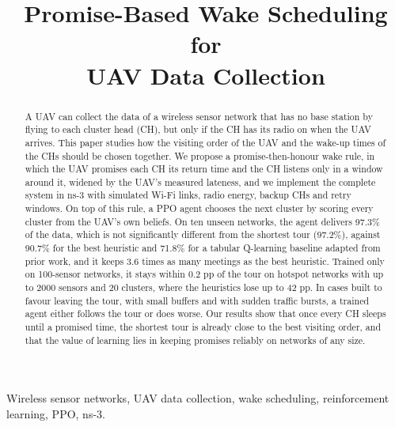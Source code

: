 \documentclass[conference]{IEEEtran}
\begin{document}
\title{Promise-Based Wake Scheduling for\\UAV Data Collection}

\author{
}

\maketitle

\begin{abstract}
A UAV can collect the data of a wireless sensor network that has no base station by flying to
each cluster head (CH), but only if the CH has its radio on when the UAV arrives. This paper
studies how the visiting order of the UAV and the wake-up times of the CHs should be chosen
together. We propose a promise-then-honour wake rule, in which the UAV promises each CH its
return time and the CH listens only in a window around it, widened by the UAV's measured
lateness, and we implement the complete system in ns-3 with simulated Wi-Fi links, radio
energy, backup CHs and retry windows. On top of this rule, a PPO agent chooses the next cluster
by scoring every cluster from the UAV's own beliefs. On ten unseen networks, the agent delivers
97.3\% of the data, which is not significantly different from the shortest tour (97.2\%),
against 90.7\% for the best heuristic and 71.8\% for a tabular Q-learning baseline adapted from
prior work, and it keeps 3.6 times as many meetings as the best heuristic. Trained only on
100-sensor networks, it stays within 0.2 pp of the tour on hotspot networks with up to 2000
sensors and 20 clusters, where the heuristics lose up to 42 pp. In cases built to favour leaving
the tour, with small buffers and with sudden traffic bursts, a trained agent either follows the
tour or does worse. Our results show that once every CH sleeps until a promised time, the
shortest tour is already close to the best visiting order, and that the value of learning lies
in keeping promises reliably on networks of any size.
\end{abstract}

\begin{IEEEkeywords}
Wireless sensor networks, UAV data collection, wake scheduling, reinforcement learning, PPO,
ns-3.
\end{IEEEkeywords}
\end{document}
